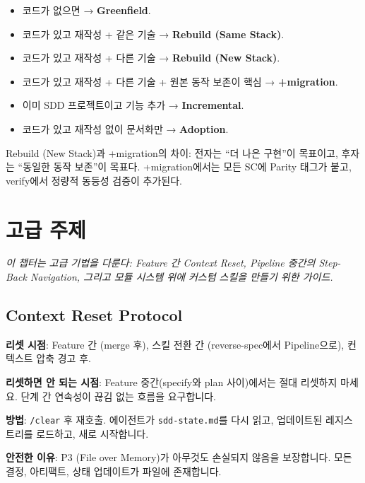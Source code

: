 \documentclass[11pt,a4paper,openright,twoside]{report}
\newcommand{\file}[1]{\texttt{#1}}
\begin{document}
\begin{tipbox}
\begin{itemize}[nosep]
  \item 코드가 없으면 → \textbf{Greenfield}.
  \item 코드가 있고 재작성 + 같은 기술 → \textbf{Rebuild (Same Stack)}.
  \item 코드가 있고 재작성 + 다른 기술 → \textbf{Rebuild (New Stack)}.
  \item 코드가 있고 재작성 + 다른 기술 + 원본 동작 보존이 핵심 → \textbf{+migration}.
  \item 이미 SDD 프로젝트이고 기능 추가 → \textbf{Incremental}.
  \item 코드가 있고 재작성 없이 문서화만 → \textbf{Adoption}.
\end{itemize}
Rebuild (New Stack)과 +migration의 차이: 전자는 ``더 나은 구현''이 목표이고, 후자는 ``동일한 동작 보존''이 목표다. +migration에서는 모든 SC에 Parity 태그가 붙고, verify에서 정량적 동등성 검증이 추가된다.
\end{tipbox}


\chapter{고급 주제}
\label{ch:advanced}

\textit{이 챕터는 고급 기법을 다룬다: Feature 간 Context Reset, Pipeline 중간의 Step-Back Navigation, 그리고 모듈 시스템 위에 커스텀 스킬을 만들기 위한 가이드.}

\section{Context Reset Protocol}

\textbf{리셋 시점}: Feature 간 (merge 후), 스킬 전환 간 (reverse-spec에서 Pipeline으로), 컨텍스트 압축 경고 후.

\textbf{리셋하면 안 되는 시점}: Feature 중간(specify와 plan 사이)에서는 절대 리셋하지 마세요. 단계 간 연속성이 끊김 없는 흐름을 요구합니다.

\textbf{방법}: \texttt{/clear} 후 재호출. 에이전트가 \file{sdd-state.md}를 다시 읽고, 업데이트된 레지스트리를 로드하고, 새로 시작합니다.

\textbf{안전한 이유}: P3 (File over Memory)가 아무것도 손실되지 않음을 보장합니다. 모든 결정, 아티팩트, 상태 업데이트가 파일에 존재합니다.
\end{document}
